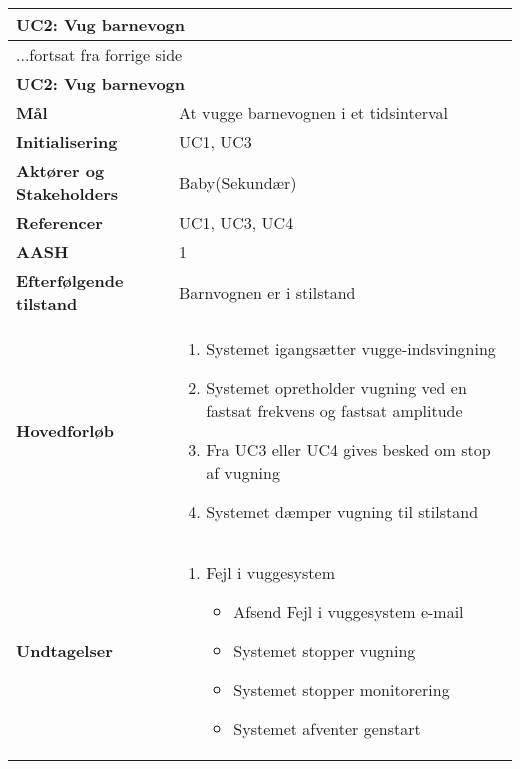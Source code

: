 \begin{center} \centering \label{kravspec:uc2}
	\begin{longtable}{|p{5cm}|p{9cm}|}  %
	\hline
		\multicolumn{2}{|l|}{\textbf{UC2: Vug barnevogn}} \\\hline %
		\endfirsthead
		
		\multicolumn{2}{l}{...fortsat fra forrige side} \\ \hline %
		\multicolumn{2}{|l|}{\textbf{UC2: Vug barnevogn}} \\\hline %
		\endhead	
		
		\textbf{Mål}							&At vugge barnevognen i et tidsinterval		\\\hline
		\textbf{Initialisering}				&UC1, UC3 \\\hline
		\textbf{Aktører og Stakeholders}		&Baby(Sekundær)		\\\hline 
		\textbf{Referencer}					&UC1, UC3, UC4		\\\hline
		\textbf{AASH}						&1		\\\hline
		\textbf{Efterfølgende tilstand}		&Barnvognen er i stilstand	\\\hline
		\textbf{Hovedforløb}					
			&\begin{enumerate}
	
				\item Systemet igangsætter vugge-indsvingning
				
				\item \label{kravspec:uc2_vugning}Systemet opretholder vugning ved en fastsat frekvens og fastsat amplitude
				\newline [Und: \ref{kravspec:uc2_vugning}.a Fejl i vuggesystem]	
				
				\item \label{kravspec:uc2_stopvugning}Fra UC3 eller UC4 	gives besked om stop af vugning	
				
				\item Systemet dæmper vugning til stilstand
				
			\end{enumerate}
		\\\hline
		\textbf{Undtagelser}
			&\begin{enumerate}[label=\ref{kravspec:uc2_vugning}.a]
			\item Fejl i vuggesystem
					\begin{itemize}
					
					\item Afsend Fejl i vuggesystem e-mail
					\item Systemet stopper vugning
					\item Systemet stopper monitorering
					\item Systemet afventer genstart
					\end{itemize}
			\end{enumerate}
		\\\hline
	\end{longtable} 
\end{center}

